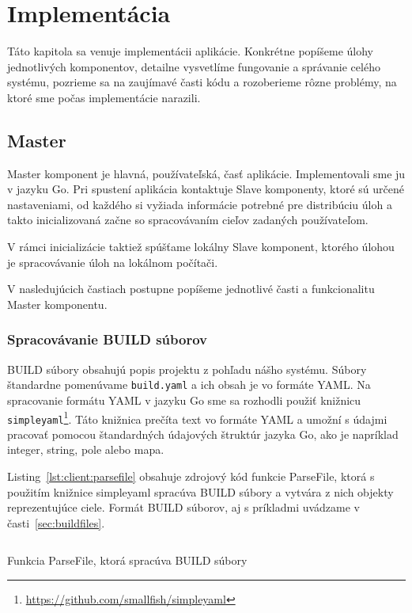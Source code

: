 \chapter{Implement\'{a}cia}
\label{ch:impl}

Táto kapitola sa venuje implementácii aplikácie. Konkrétne popíšeme úlohy
jednotlivých komponentov, detailne vysvetlíme fungovanie a správanie celého
systému, pozrieme sa na zaujímavé časti kódu a rozoberieme rôzne problémy,
na ktoré sme počas implementácie narazili.

\section{Master}
\label{sec:master}

Master komponent je hlavná, používateľská, časť aplikácie. Implementovali sme ju
v jazyku Go. Pri spustení aplikácia kontaktuje Slave komponenty, ktoré sú
určené nastaveniami, od každého si vyžiada informácie potrebné pre distribúciu
úloh a takto inicializovaná začne so spracovávaním cieľov zadaných používateľom.

V rámci inicializácie taktiež spúšťame lokálny Slave komponent, ktorého úlohou je
spracovávanie úloh na lokálnom počítači.

V nasledujúcich častiach postupne popíšeme jednotlivé časti a funkcionalitu Master
komponentu.

\subsection{Spracov\'{a}vanie BUILD s\'{u}borov}
\label{sec:master:buildfile}

BUILD súbory obsahujú popis projektu z pohľadu nášho systému. Súbory štandardne
pomenúvame \texttt{build.yaml} a ich obsah je vo formáte YAML\@. Na spracovanie
formátu YAML v jazyku Go sme sa rozhodli použiť knižnicu
\texttt{simpleyaml}\footnote{\url{https://github.com/smallfish/simpleyaml}}.
Táto knižnica prečíta text vo formáte YAML a umožní s údajmi pracovať pomocou
štandardných údajových štruktúr jazyka Go, ako je napríklad integer, string,
pole alebo mapa.

Listing~\ref{lst:client:parsefile} obsahuje zdrojový kód funkcie ParseFile, ktorá
s použitím knižnice simpleyaml spracúva BUILD súbory a vytvára z nich objekty
reprezentujúce ciele. Formát BUILD súborov, aj s príkladmi uvádzame v časti~\ref{sec:buildfiles}.

\begin{listing}[H]
  \inputminted[frame=lines,framesep=2mm,linenos,fontsize=\scriptsize,firstline=65,lastline=96]{go}{/home/pepol/src/imterra/forge/client/target/parse.go}
  \caption[Funkcia ParseFile]{Funkcia ParseFile, ktorá spracúva BUILD súbory}
  \label{lst:client:parsefile}
\end{listing}

